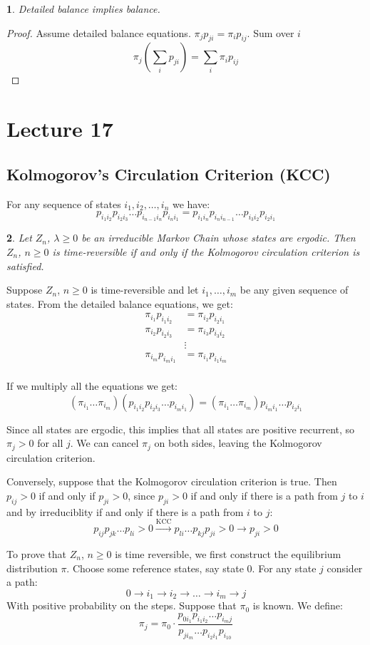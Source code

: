 \documentclass[english,12pt]{article}
\theoremstyle{plain}
\newtheorem*{proposition}{\protect\propositionname}
\theoremstyle{definition}
\theoremstyle{definition} %
\newcommand{\prop}[1]{\begin{proposition} #1 \end{proposition} }
\newcommand{\prf}[1]{\begin{proof} #1 \end{proof} }
\providecommand{\propositionname}{Proposition}
\begin{document}
\prop{
Detailed balance implies balance.
}

\prf{
Assume detailed balance equations. $\pi_j p_{ji} = \pi_i p_{ij}$. Sum over $i$
\[ \pi_j \left( \sum_i p_{ji} \right) = \sum_i \pi_i p_{ij} \]
}

\section*{Lecture 17}
\subsection{Kolmogorov's Circulation Criterion (KCC)}
For any sequence of states $i_1,i_2,\ldots, i_n$ we have:
\[p_{i_1i_2}p_{i_2i_3}\ldots p_{i_{n-1}i_{n}}p_{i_ni_1}=p_{i_1i_n}p_{i_ni_{n-1}}\ldots p_{i_3i_2}p_{i_2i_1}\]

\prop{
Let $Z_n$, $\lambda\ge 0$ be an irreducible Markov Chain whose states are ergodic.  Then $Z_n$, $n\ge 0$ is time-reversible if and only if the Kolmogorov circulation criterion is satisfied.
}

Suppose $Z_n$, $n\ge 0$ is time-reversible and let $i_1,\ldots,i_m$ be any given sequence of states.  From the detailed balance equations, we get:
\begin{align*}
\pi_{i_1}p_{i_1i_2}&=\pi_{i_2}p_{i_2i_1}\\
\pi_{i_2}p_{i_2i_3}&=\pi_{i_3}p_{i_3i_2}\\
&\vdots\\
\pi_{i_m}p_{i_mi_1}&=\pi_{i_1}p_{i_1i_m}\\
\end{align*}

If we multiply all the equations we get:
\[(\pi_{i_1}\ldots\pi_{i_m})(p_{i_1i_2}p_{i_2i_3}\ldots p_{i_mi_1})=(\pi_{i_1}\ldots\pi_{i_m})p_{i_mi_1}\ldots p_{i_2i_1}\]

Since all states are ergodic, this implies that all states are positive recurrent, so $\pi_j>0$ for all $j$.  We can cancel $\pi_j$ on both sides, leaving the Kolmogorov circulation criterion.

Conversely, suppose that the Kolmogorov circulation criterion is true.  Then $p_{ij}>0$ if and only if $p_{ji}>0$, since $p_{ji}>0$ if and only if there is a path from $j$ to $i$ and by irreduciblity if and only if there is a path from $i$ to $j$:
\[p_{ij}p_{jk}\ldots p_{li}>0\xrightarrow{\text{KCC}}p_{li}\ldots p_{kj}p_{ji}>0\rightarrow p_{ji}>0\]

To prove that $Z_n$, $n\ge 0$ is time reversible, we first construct the equilibrium distribution $\pi$.  Choose some reference states, say state $0$.  For any state $j$ consider a path:
\[0\to i_1\to i_2\to\ldots\to i_m\to j\]
With positive probability on the steps.  Suppose that $\pi_0$ is known.  We define:
\[\pi_j=\pi_0\cdot\frac{p_{0i_1}p_{i_1i_2}\ldots p_{i_mj}}{p_{ji_m}\ldots p_{i_2i_1}p_{i_10}}\]
\end{document}

